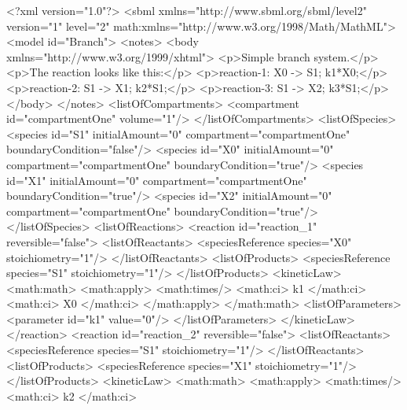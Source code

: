 \documentclass[10pt]{cekarticle}
\begin{document}
\begin{example}
<?xml version="1.0"?>
<sbml xmlns="http://www.sbml.org/sbml/level2" version="1" level="2"
      math:xmlns="http://www.w3.org/1998/Math/MathML">
    <model id="Branch">
        <notes>
            <body xmlns="http://www.w3.org/1999/xhtml">
                <p>Simple branch system.</p>
                <p>The reaction looks like this:</p>
                <p>reaction-1:   X0 -> S1; k1*X0;</p>
                <p>reaction-2:   S1 -> X1; k2*S1;</p>
                <p>reaction-3:   S1 -> X2; k3*S1;</p>
            </body>
        </notes>
        <listOfCompartments>
            <compartment id="compartmentOne" volume="1"/>
        </listOfCompartments>
        <listOfSpecies>
            <species id="S1" initialAmount="0" compartment="compartmentOne"
                    boundaryCondition="false"/>
            <species id="X0" initialAmount="0" compartment="compartmentOne"
                    boundaryCondition="true"/>
            <species id="X1" initialAmount="0" compartment="compartmentOne"
                    boundaryCondition="true"/>
            <species id="X2" initialAmount="0" compartment="compartmentOne"
                    boundaryCondition="true"/>
        </listOfSpecies>
        <listOfReactions>
            <reaction id="reaction_1" reversible="false">
                <listOfReactants>
                    <speciesReference species="X0" stoichiometry="1"/>
                </listOfReactants>
                <listOfProducts>
                    <speciesReference species="S1" stoichiometry="1"/>
                </listOfProducts>
                <kineticLaw>
                    <math:math>
                        <math:apply>
                            <math:times/>
                            <math:ci> k1 </math:ci>
                            <math:ci> X0 </math:ci>
                        </math:apply>
                    </math:math>
                    <listOfParameters>
                        <parameter id="k1" value="0"/>
                    </listOfParameters>
                </kineticLaw>
            </reaction>
            <reaction id="reaction_2" reversible="false">
                <listOfReactants>
                    <speciesReference species="S1" stoichiometry="1"/>
                </listOfReactants>
                <listOfProducts>
                    <speciesReference species="X1" stoichiometry="1"/>
                </listOfProducts>
                <kineticLaw>
                    <math:math>
                        <math:apply>
                            <math:times/>
                            <math:ci> k2 </math:ci>

\end{example}
\end{document}
